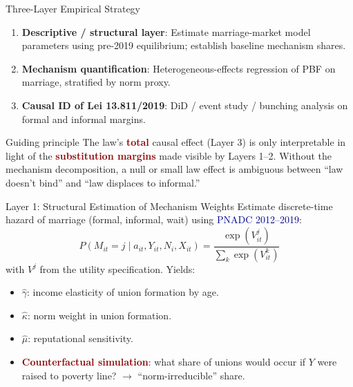 \documentclass[aspectratio=169,10pt]{beamer}
\newcommand{\onecite}[1]{\textcolor{darkblue}{\textsc{#1}}}
\newcommand{\hl}[1]{\textcolor{darkred}{\textbf{#1}}}
\begin{document}
\begin{frame}{Three-Layer Empirical Strategy}
    \begin{enumerate}
        \item \textbf{Descriptive / structural layer}: Estimate marriage-market model parameters using pre-2019 equilibrium; establish baseline mechanism shares.
        \item \textbf{Mechanism quantification}: Heterogeneous-effects regression of PBF on marriage, stratified by norm proxy.
        \item \textbf{Causal ID of Lei 13.811/2019}: DiD / event study / bunching analysis on formal and informal margins.
    \end{enumerate}

    \vspace{0.3cm}
    \begin{block}{Guiding principle}
        The law's \hl{total} causal effect (Layer 3) is only interpretable in light of the \hl{substitution margins} made visible by Layers 1--2. Without the mechanism decomposition, a null or small law effect is ambiguous between ``law doesn't bind'' and ``law displaces to informal.''
    \end{block}
\end{frame}

\begin{frame}{Layer 1: Structural Estimation of Mechanism Weights}
    Estimate discrete-time hazard of marriage (formal, informal, wait) using \onecite{PNADC 2012--2019}:
    \[
    P(M_{it} = j \mid a_{it}, Y_{it}, N_i, X_{it}) = \frac{\exp(V^j_{it})}{\sum_k \exp(V^k_{it})}
    \]
    with $V^j$ from the utility specification. Yields:
    \begin{itemize}
        \item $\hat{\gamma}$: income elasticity of union formation by age.
        \item $\hat{\kappa}$: norm weight in union formation.
        \item $\hat{\mu}$: reputational sensitivity.
        \item \hl{Counterfactual simulation}: what share of unions would occur if $Y$ were raised to poverty line? $\rightarrow$ ``norm-irreducible'' share.
    \end{itemize}
\end{frame}
\end{document}
